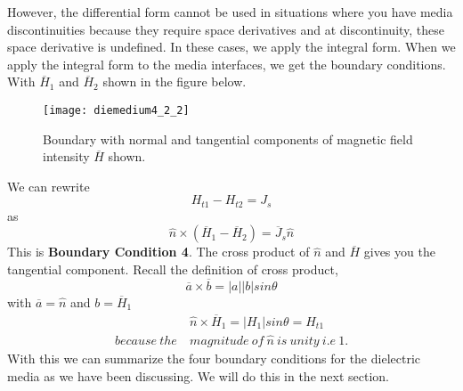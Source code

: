 	  However, the differential form cannot be used in situations where you have media discontinuities because they require space derivatives and at discontinuity, these space derivative is undefined. In these cases, we apply the integral form. When we apply the integral form to the media interfaces, we get the boundary conditions. With $\overline{H}_1$ and $\overline{H}_2$ shown in the figure below.
	  \begin{figure}[h]
	  	\centering
	  	\texttt{[image: diemedium4\_2\_2]}
	  	\caption{Boundary with normal and tangential components of magnetic field intensity $\overline{H}$ shown.}
	  \end{figure}
  We can rewrite 
  \begin{equation*}
  H_{t1} - H_{t2} = J_s
  \end{equation*}
  as
  \begin{equation}
  \hat{n} \times (\overline{H}_1 - \overline{H}_2) = \overline{J}_s\hat{n}
  \end{equation}
  This is \textbf{Boundary Condition 4}. The cross product of $\hat{n}$ and $\overline{H}$ gives you the tangential component. Recall the definition of cross product,
  \begin{equation*}
  \overline{a}\times\overline{b} = \left|a \right| \left|b \right|sin\theta 
  \end{equation*}
  with $\overline{a} = \hat{n}$ and $ b = \overline{H}_1$
  \begin{align*}
  &\hat{n}\times\overline{H}_1 = \left|H_1 \right|sin\theta = H_{t1} \\ because\ the\ & magnitude\ of\ \hat{n}\ is\ unity\ i.e\ 1.
  \end{align*}
  With this we can summarize the four boundary conditions for the dielectric media as we have been discussing. We will do this in the next section.

